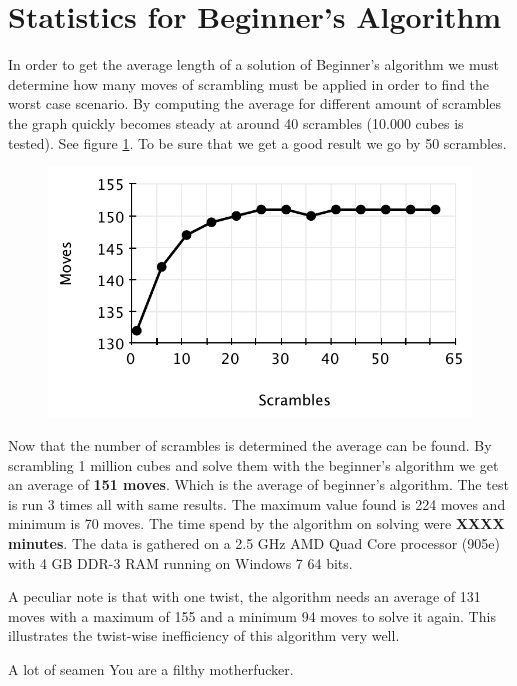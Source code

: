 \section{Statistics for Beginner's Algorithm}
\label{sec:beginnersStat}
In order to get the average length of a solution of Beginner's algorithm we must determine how many moves of scrambling must be applied in order to find the worst case scenario. 
By computing the average for different amount of scrambles the graph quickly becomes steady at around 40 scrambles (10.000 cubes is tested). See figure \ref{fig:beginnersScramble}. To be sure that we get a good result we go by 50 scrambles.
\begin{figure}[htbp]
	\centering
		\includegraphics{input/pics/beginnersScramble.pdf}
	\caption{}
	\label{fig:beginnersScramble}
\end{figure}

Now that the number of scrambles is determined the average can be found.
By scrambling 1 million cubes and solve them with the beginner's algorithm we get an average of \textbf{151 moves}. 
Which is the average of beginner's algorithm. The test is run 3 times all with same results.
The maximum value found is 224 moves and minimum is 70 moves. 
The time spend by the algorithm on solving were \textbf{XXXX minutes}. 
The data is gathered on a 2.5 GHz AMD Quad Core processor (905e) with 4 GB DDR-3 RAM running on Windows 7 64 bits.

A peculiar note is that with one twist, the algorithm needs an average of 131 moves with a maximum of 155 and a minimum 94 moves to solve it again.
This illustrates the twist-wise inefficiency of this algorithm very well.


A lot of seamen You are a filthy motherfucker.